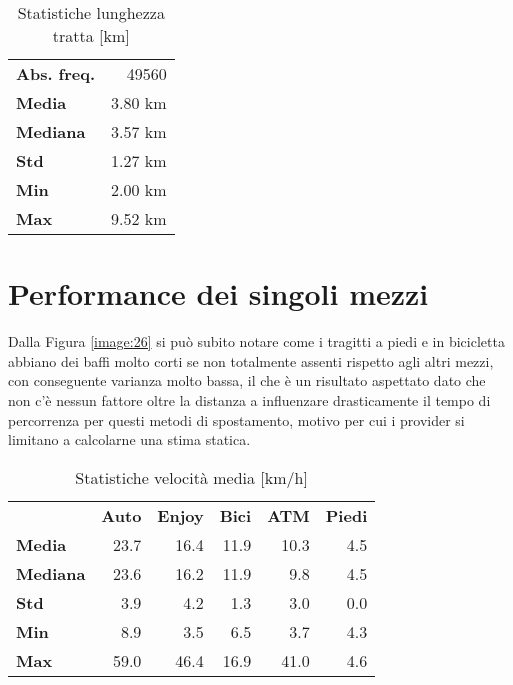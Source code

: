 \begin{table}[H]
\centering
\begin{tabular}{ | l r | }
\hline
\textbf{Abs. freq.} & 49560 \\
\textbf{Media} & 3.80 km \\
\textbf{Mediana} & 3.57 km \\
\textbf{Std} & 1.27 km \\
\textbf{Min} & 2.00 km \\
\textbf{Max} & 9.52 km \\
\hline
\end{tabular}
\caption{Statistiche lunghezza tratta [km]}
\label{table:2}
\end{table}

\section{Performance dei singoli mezzi}

Dalla Figura  \ref{image:26} si può subito notare come i tragitti a piedi e in bicicletta abbiano dei baffi molto corti se non totalmente assenti rispetto agli altri mezzi, con conseguente varianza molto bassa, il che è un risultato aspettato dato che non c'è nessun fattore oltre la distanza a influenzare drasticamente il tempo di percorrenza per questi metodi di spostamento, motivo per cui i provider si limitano a calcolarne una stima statica.

\begin{table}[H]
	\centering
	\begin{tabular}{ | l r r r r r | }
		\hline
		& \textbf{Auto} & \textbf{Enjoy} & \textbf{Bici} & \textbf{ATM} & \textbf{Piedi} \\
		\textbf{Media}      & 23.7 & 16.4 & 11.9 & 10.3 & 4.5 \\
		\textbf{Mediana} & 23.6 & 16.2 & 11.9 &   9.8 & 4.5 \\
		\textbf{Std}             &  3.9 &   4.2 &   1.3 &    3.0 & 0.0 \\
		\textbf{Min}            &  8.9 &   3.5 &   6.5 &    3.7 & 4.3 \\
		\textbf{Max}         & 59.0 & 46.4 & 16.9 &  41.0 & 4.6 \\
		\hline
	\end{tabular}
	\caption{Statistiche velocità media [km/h]}
	\label{table:3}
\end{table}

